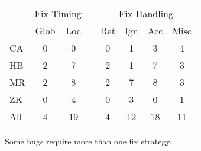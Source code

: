 

\begin{table}[t]
\small
\centering
\begin{tabular}{lccccccc}
\toprule
   & \multicolumn{2}{c}{Fix Timing} && \multicolumn{4}{c}{Fix Handling}\\
\cmidrule{2-3}
\cmidrule{5-8}
   & Glob & Loc & & Ret & Ign & Acc & Misc \\
\midrule
CA & 0   & 0 &&0 &1 & 3 & 4 \\
HB & 2   & 7 &&2 &1 & 7 & 3 \\
MR & 2   & 8 &&2 &7 & 8 & 3 \\
ZK & 0   & 4 &&0 &3 & 0 & 1 \\
\midrule
All& 4   & 19&&4 &12& 18& 11\\
\bottomrule
\end{tabular}
{Some bugs require more than one fix strategy.}
\end{table}

